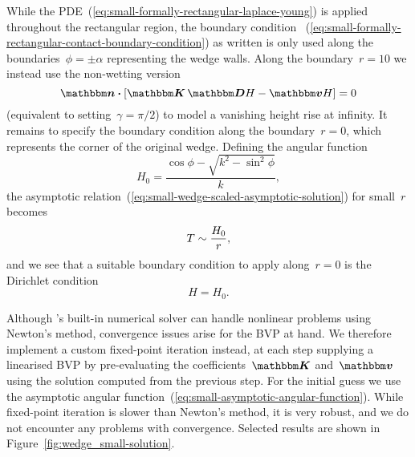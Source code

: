 While the PDE~(\ref{eq:small-formally-rectangular-laplace-young})
is applied throughout the rectangular region,
the boundary condition~%
  (\ref{eq:small-formally-rectangular-contact-boundary-condition})
as written
is only used along the boundaries~$\phi = \pm\alpha$
representing the wedge walls.
Along the boundary~$r = 10$ we instead use the non-wetting version
\begin{equation}
  \mat{n} \dotp \squarebr[\bulkysize]{\mat{K} \matder H - \mat{v} H} = 0
  \label{eq:small-formally-rectangular-natural-boundary-condition}
\end{equation}
(equivalent to setting~$\gamma = \pi/2$)
to model a vanishing height rise at infinity.
It remains to specify the boundary condition along the boundary~$r = 0$,
which represents the corner of the original wedge.
Defining the angular function
\begin{equation}
  H_0 = \frac{\cos\phi - \sqrt{k^2 - \sin^2 \phi}}{k},
  \label{eq:small-asymptotic-angular-function}
\end{equation}
the asymptotic relation~(\ref{eq:small-wedge-scaled-asymptotic-solution})
for small~$r$ becomes
\begin{equation}
  T \sim \frac{H_0}{r},
  \label{eq:small-asymptotic-solution}
\end{equation}
and we see that a suitable boundary condition to apply along~$r = 0$
is the Dirichlet condition
\begin{equation}
  H = H_0.
  \label{eq:small-formally-rectangular-dirichlet-condition}
\end{equation}

Although 's built-in numerical solver
can handle nonlinear problems using Newton's method,
convergence issues arise for the BVP at hand.
We therefore implement a custom fixed-point iteration instead,
at each step supplying a linearised BVP
by pre-evaluating the coefficients~$\mat{K}$ and~$\mat{v}$
using the solution computed from the previous step.
For the initial guess we use
the asymptotic angular function~(\ref{eq:small-asymptotic-angular-function}).
While fixed-point iteration is slower than Newton's method,
it is very robust, and we do not encounter any problems with convergence.
Selected results are shown in Figure~\ref{fig:wedge_small-solution}.

